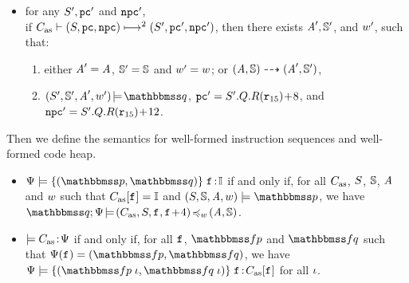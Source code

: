\begin{definition}
\begin{enumerate}[1.]
\begin{itemize}
                \item for any $\state', \pc'$ and $\npc'$, \\
                if
                $\multilptrans{\asmimp}{2}{(\state, \pc, \npc)}{(\state', \pc', \npc')}$,
                then there exists $\primcom', \hpstate'$, and $\word'$,
                such that:
                \begin{enumerate}[(1)]
                    \item either $\primcom' = \primcom$,
                    $\hpstate' = \hpstate$ and $\word' = \word$;
                    or
                    $\primTrans{(\primcom, \hpstate)}
                        {(\primcom', \hpstate')}$,
                    \item $\asrtmodel{(\state', \hpstate', \primcom', \word')}
                        {\relastQ}$,
                        $\pc' = \state'.\Rstate.\RFile(\reg{15}) \!+\! 8$,
                        and
                        $\npc' = \state'.\Rstate.\RFile(\reg{15}) \!+\! 12$.
                \end{enumerate}
            \end{itemize}
    \end{enumerate}
\end{definition}

Then we define the semantics for well-formed instruction
sequences and well-formed code heap.

\begin{definition}
	\em
	\label{def:soundness of instruction sequence}
    \mbox{}
    \begin{itemize}
    \item $\semwfseqrel{\Cspec}{\relastP}{\relastQ}{\cblk}$ if and only if, for all
    $\asmimp$, $\state$, $\hpstate$, $\primcom$ and $\word$
    such that $\asmimp[\lab{}] = \cblk$
    and $(\state, \hpstate, \primcom, \word) \models \relastP$, we have
    $\simInsSeq{\relastQ}{\Cspec}
        {(\asmimp, \state, \lab{}, \lab{}\!+\!4)}{\word}{(\primcom, \hpstate)}$.
    \item
    $\models \asmimp \!:\! \Cspec$ if and only if, for all
    $\lab{}$, $\relspecpre$ and $\relspecpost$ %
    such that $\Cspec(\lab{}) = (\relspecpre, \relspecpost)$,
    we have $\semwfseqrel{\Cspec}{\relspecpre \; \lgvl}{\relspecpost \; \lgvl}{\asmimp[\lab{}]}$
    for all $\lgvl$.
    \end{itemize}
\end{definition}

